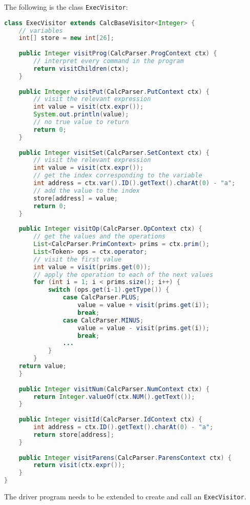 \documentclass[a4paper, openany]{memoir}
\begin{document}
The following is the class \texttt{ExecVisitor}:
\begin{lstlisting}[language=java]
class ExecVisitor extends CalcBaseVisitor<Integer> {
    // variables
    int[] store = new int[26];
    
    public Integer visitProg(CalcParser.ProgContext ctx) {
        // interpret every command in the program
        return visitChildren(ctx);
    }
    
    public Integer visitPut(CalcParser.PutContext ctx) {
        // visit the relevant expression
        int value = visit(ctx.expr());
        System.out.println(value);
        // no true value to return
        return 0;
    }
    
    public Integer visitSet(CalcParser.SetContext ctx) {
        // visit the relevant expression
        int value = visit(ctx.expr());
        // get the index corresponding to the variable
        int address = ctx.var().ID().getText().charAt(0) - "a";
        // add the value to the index
        store[address] = value;
        return 0;
    }
    
    public Integer visitOp(CalcParser.OpContext ctx) {
        // get the values and the operations
        List<CalcParser.PrimContext> prims = ctx.prim();
        List<Token> ops = ctx.operator;
        // visit the first value
        int value = visit(prims.get(0));
        // apply the operation to each of the next values
        for (int i = 1; i < prims.size(); i++) {
            switch (ops.get(i-1).getType()) {
                case CalcParser.PLUS;
                    value = value + visit(prims.get(i));
                    break;
                case CalcParser.MINUS;
                    value = value - visit(prims.get(i));
                    break;
                ...
            }
        }
    return value;
    }
    
    public Integer visitNum(CalcParser.NumContext ctx) {
        return Integer.valueOf(ctx.NUM().getText());
    }
    
    public Integer visitId(CalcParser.IdContext ctx) {
        int address = ctx.ID().getText().charAt(0) - "a";
        return store[address];
    }
    
    public Integer visitParens(CalcParser.ParensContext ctx) {
        return visit(ctx.expr());
    }
}
\end{lstlisting}

The driver program needs to be extended to create and call an \texttt{ExecVisitor}.
\end{document}
